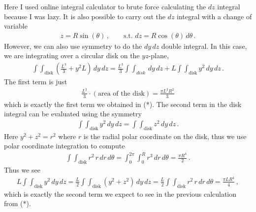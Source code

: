 \documentclass[11pt]{article}
\begin{document}
Here I used online integral calculator to brute force calculating the $dz$ integral because I was lazy. It is also possible to carry out the $dz$ integral with a change of variable 
\begin{align*}
z = R\sin(\theta)\,,\qquad\text{s.t. }dz = R\cos(\theta) \, d\theta\,.
\end{align*}
However, we can also use symmetry to do the $dy\, dz$ double integral. In this case, we are integrating over a circular disk on the $yz$-plane, 
\begin{align*}
\int\int_{\text{disk}} \left( \frac{L^3}{3} + y^2 L\right) \, dy\, dz = \frac{L^3}{3}\int\int_{disk}\, dy\, dz + L \int\int_{\text{disk}}y^2\, dy\, dz \,.
\end{align*}
The first term is just
\begin{align*}
\frac{L^3}{3} \cdot (\text{area of the disk}) = \frac{ \pi L^3 R^2}{3}
\end{align*}
which is exactly the first term we obtained in (*). The second term in the disk integral can be evaluated using the symmetry 
\begin{align*}
\int\int_{\text{disk}}y^2\, dy\, dz =
\int\int_{\text{disk}}z^2\, dy\, dz\,.
\end{align*}
Here $y^2 + z^2 = r^2$ where $r$ is the radial polar coordinate on the disk, thus we use polar coordinate integration to compute
\begin{align*}
\int\int_{\text{disk}}r^2 \, r\, dr\, d\theta = \int_0^{2\pi}\int_0^R r^3 \, dr\, d\theta = \frac{\pi R^4}{2}\,.
\end{align*}
Thus we see
\begin{align*}
L\int\int_{\text{disk}}y^2\, dy\, dz = \frac{L}{2}\int\int_{\text{disk}}(y^2+z^2)\, dy\, dz = \frac{L}{2}\int\int_{\text{disk}}r^2 \, r\, dr\, d\theta = \frac{\pi L R^4}{4}\,,
\end{align*}
which is exactly the second term we expect to see in the previous calculation from (*). \\
\end{document}
